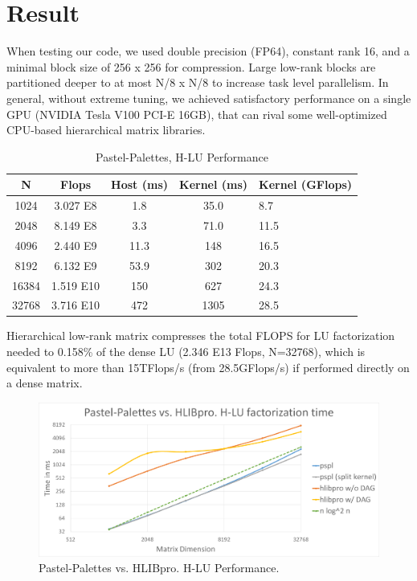 \documentclass[sigconf]{acmart}
\begin{document}
\section{Result}
When testing our code, we used double precision (FP64), constant rank 16, and a minimal block size of 256 x 256 for compression. Large low-rank blocks are partitioned deeper to at most N/8 x N/8 to increase task level parallelism. In general, without extreme tuning, we achieved satisfactory performance on a single GPU (NVIDIA Tesla V100 PCI-E 16GB), that can rival some well-optimized CPU-based hierarchical matrix libraries.

\begin{table}[ht]
  \caption{Pastel-Palettes, H-LU Performance}
  \begin{tabular}{ccccl}
    \toprule
    N & Flops & Host (ms) & Kernel (ms) & Kernel (GFlops)\\
    \midrule
    1024 & 3.027 E8 & 1.8 & 35.0 & 8.7\\
    2048 & 8.149 E8 & 3.3 & 71.0 & 11.5\\
    4096 & 2.440 E9 & 11.3 & 148 & 16.5\\
    8192 & 6.132 E9 & 53.9 & 302 & 20.3\\
    16384 & 1.519 E10 & 150 & 627 & 24.3\\
    32768 & 3.716 E10 & 472 & 1305 & 28.5\\
  \bottomrule
\end{tabular}
\end{table}

Hierarchical low-rank matrix compresses the total FLOPS for LU factorization needed to 0.158\% of the dense LU (2.346 E13 Flops, N=32768), which is equivalent to more than 15TFlops/s (from 28.5GFlops/s) if performed directly on a dense matrix.

\begin{figure}[ht]
  \centering
  \includegraphics[width=\linewidth]{pspl_vs_hlibpro}
  \caption{Pastel-Palettes vs. HLIBpro. H-LU Performance.}
\end{figure}
\end{document}
